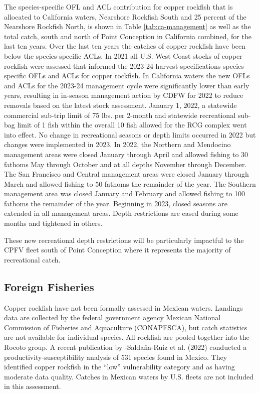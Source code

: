 \documentclass[11pt,
  english,
  letterpaper,
]{article}
\begin{document}
The species-specific OFL and ACL contribution for copper rockfish that is allocated to California waters, Nearshore Rockfish South and 25 percent of the Nearshore Rockfish North, is shown in Table \ref{tab:ca-management} as well as the total catch, south and north of Point Conception in California combined, for the last ten years. Over the last ten years the catches of copper rockfish have been below the species-specific ACLs. In 2021 all U.S. West Coast stocks of copper rockfish were assessed that informed the 2023-24 harvest specifications species-specific OFLs and ACLs for copper rockfish. In California waters the new OFLs and ACLs for the 2023-24 management cycle were significantly lower than early years, resulting in in-season management action by CDFW for 2022 to reduce removals based on the latest stock assessment. January 1, 2022, a statewide commercial sub-trip limit of 75 lbs. per 2-month and statewide recreational sub-bag limit of 1 fish within the overall 10 fish allowed for the RCG complex went into effect. No change in recreational seasons or depth limits occurred in 2022 but changes were implemented in 2023. In 2022, the Northern and Mendocino management areas were closed January through April and allowed fishing to 30 fathoms May through October and at all depths November through December. The San Francisco and Central management areas were closed January through March and allowed fishing to 50 fathoms the remainder of the year. The Southern management area was closed January and February and allowed fishing to 100 fathoms the remainder of the year. Beginning in 2023, closed seasons are extended in all management areas. Depth restrictions are eased during some months and tightened in others.

These new recreational depth restrictions will be particularly impactful to the CPFV fleet south of Point Conception where it represents the majority of recreational catch.

\hypertarget{foreign-fisheries}{%
\subsection{Foreign Fisheries}\label{foreign-fisheries}}

Copper rockfish have not been formally assessed in Mexican waters. Landings data are collected by the federal government agency Mexican National Commission of Fisheries and Aquaculture (CONAPESCA), but catch statistics are not available for individual species. All rockfish are pooled together into the Rocoto group. A recent publication by -Saldaña-Ruiz et al. (2022) conducted a productivity-susceptibility analysis of 531 species found in Mexico. They identified copper rockfish in the ``low'' vulnerability category and as having moderate data quality. Catches in Mexican waters by U.S. fleets are not included in this assessment.
\end{document}

